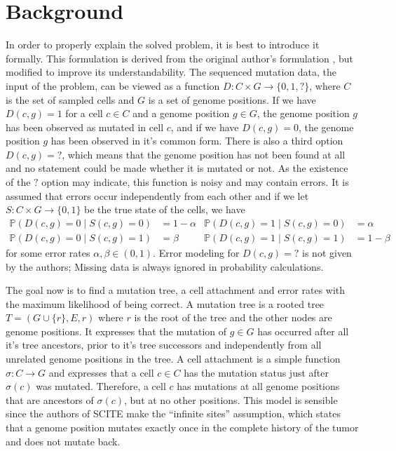 \section{Background}

In order to properly explain the solved problem, it is best to introduce it formally. This formulation is derived from the original author's formulation \cite{tree2016}, but modified to improve its understandability. The sequenced mutation data, the input of the problem, can be viewed as a function $D: C \times G \rightarrow \{0, 1, ?\}$, where $C$ is the set of sampled cells and $G$ is a set of genome positions. If we have $D(c, g) = 1$ for a cell $c \in C$ and a genome position $g \in G$, the genome position $g$ has been observed as mutated in cell $c$, and if we have $D(c, g) = 0$, the genome position $g$ has been observed in it's common form. There is also a third option $D(c, g) = ?$, which means that the genome position has not been found at all and no statement could be made whether it is mutated or not. As the existence of the $?$ option may indicate, this function is noisy and may contain errors. It is assumed that errors occur independently from each other and if we let $S: C \times G \rightarrow \{0, 1\}$ be the true state of the cells, we have
\begin{align*}
    \mathbb{P}(D(c, g) = 0 \mid S(c, g) = 0) &= 1 - \alpha & \mathbb{P}(D(c, g) = 1 \mid S(c, g) = 0) &= \alpha \\
    \mathbb{P}(D(c, g) = 0 \mid S(c, g) = 1) &= \beta & \mathbb{P}(D(c, g) = 1 \mid S(c, g) = 1) &= 1 - \beta
\end{align*}
for some error rates $\alpha, \beta \in (0, 1)$. Error modeling for $D(c, g) = ?$ is not given by the authors; Missing data is always ignored in probability calculations.

The goal now is to find a mutation tree, a cell attachment and error rates with the maximum likelihood of being correct. A mutation tree is a rooted tree $T = (G \cup \{r\}, E, r)$ where $r$ is the root of the tree and the other nodes are genome positions. It expresses that the mutation of $g \in G$ has occurred after all it's tree ancestors, prior to it's tree successors and independently from all unrelated genome positions in the tree. A cell attachment is a simple function $\sigma: C \rightarrow G$ and expresses that a cell $c \in C$ has the mutation status just after $\sigma(c)$ was mutated. Therefore, a cell $c$ has mutations at all genome positions that are ancestors of $\sigma(c)$, but at no other positions. This model is sensible since the authors of \ac{SCITE} make the ``infinite sites'' assumption, which states that a genome position mutates exactly once in the complete history of the tumor and does not mutate back.

